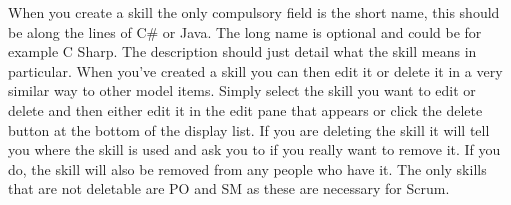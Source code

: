 When you create a skill the only compulsory field is the short name, this should be along the lines of C\# or Java. The long name is optional and could be for example C Sharp. The description should just detail what the skill means in particular.
\newline\newline
When you've created a skill you can then edit it or delete it in a very similar way to other model items. Simply select the skill you want to edit or delete and then either edit it in the edit pane that appears or click the delete button at the bottom of the display list. If you are deleting the skill it will tell you where the skill is used and ask you to if you really want to remove it. If you do, the skill will also be removed from any people who have it. The only skills that are not deletable are PO and SM as these are necessary for Scrum.